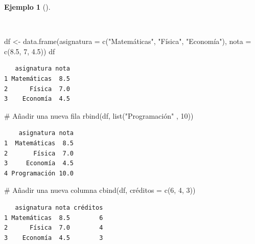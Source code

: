 \documentclass[
  a4paper,
]{scrreport}
\newenvironment{Shaded}{\begin{snugshade}}{\end{snugshade}}
\newcommand{\AttributeTok}[1]{\textcolor[rgb]{0.40,0.45,0.13}{#1}}
\newcommand{\CommentTok}[1]{\textcolor[rgb]{0.37,0.37,0.37}{#1}}
\newcommand{\DecValTok}[1]{\textcolor[rgb]{0.68,0.00,0.00}{#1}}
\newcommand{\FloatTok}[1]{\textcolor[rgb]{0.68,0.00,0.00}{#1}}
\newcommand{\FunctionTok}[1]{\textcolor[rgb]{0.28,0.35,0.67}{#1}}
\newcommand{\NormalTok}[1]{\textcolor[rgb]{0.00,0.23,0.31}{#1}}
\newcommand{\OtherTok}[1]{\textcolor[rgb]{0.00,0.23,0.31}{#1}}
\newcommand{\StringTok}[1]{\textcolor[rgb]{0.13,0.47,0.30}{#1}}
\theoremstyle{definition}
\theoremstyle{definition}
\newtheorem{example}{Ejemplo}[chapter]
\theoremstyle{remark}
\begin{document}
\begin{example}[]\protect\hypertarget{exm-añadir-filas-columnas-data-frame}{}\label{exm-añadir-filas-columnas-data-frame}

~

\begin{Shaded}
\begin{Highlighting}[]
\NormalTok{df }\OtherTok{\textless{}{-}} \FunctionTok{data.frame}\NormalTok{(}\AttributeTok{asignatura =} \FunctionTok{c}\NormalTok{(}\StringTok{"Matemáticas"}\NormalTok{, }\StringTok{"Física"}\NormalTok{, }\StringTok{"Economía"}\NormalTok{), }\AttributeTok{nota =} \FunctionTok{c}\NormalTok{(}\FloatTok{8.5}\NormalTok{, }\DecValTok{7}\NormalTok{, }\FloatTok{4.5}\NormalTok{))}
\NormalTok{df}
\end{Highlighting}
\end{Shaded}

\begin{verbatim}
   asignatura nota
1 Matemáticas  8.5
2      Física  7.0
3    Economía  4.5
\end{verbatim}

\begin{Shaded}
\begin{Highlighting}[]
\CommentTok{\# Añadir una nueva fila}
\FunctionTok{rbind}\NormalTok{(df, }\FunctionTok{list}\NormalTok{(}\StringTok{"Programación"}\NormalTok{ , }\DecValTok{10}\NormalTok{))}
\end{Highlighting}
\end{Shaded}

\begin{verbatim}
    asignatura nota
1  Matemáticas  8.5
2       Física  7.0
3     Economía  4.5
4 Programación 10.0
\end{verbatim}

\begin{Shaded}
\begin{Highlighting}[]
\CommentTok{\# Añadir una nueva columna}
\FunctionTok{cbind}\NormalTok{(df, créditos }\OtherTok{=} \FunctionTok{c}\NormalTok{(}\DecValTok{6}\NormalTok{, }\DecValTok{4}\NormalTok{, }\DecValTok{3}\NormalTok{))}
\end{Highlighting}
\end{Shaded}

\begin{verbatim}
   asignatura nota créditos
1 Matemáticas  8.5        6
2      Física  7.0        4
3    Economía  4.5        3
\end{verbatim}

\end{example}
\end{document}
